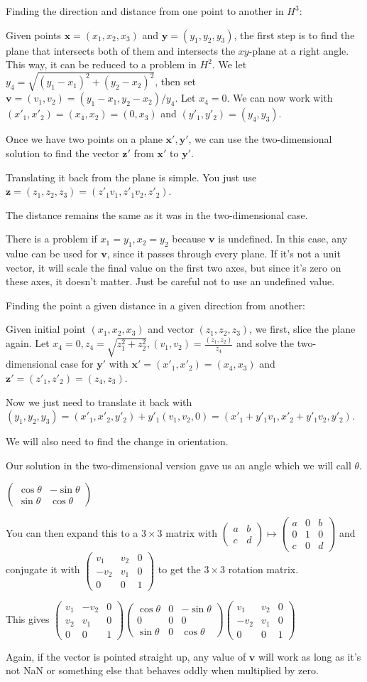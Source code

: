 \documentclass[12pt]{amsart}
\newcommand{\mat}[4]{\left(\begin{array}{ccc} #1 & #2 \\#3 & #4 \end{array} \right)}
\newcommand{\matc}[9]{\left(\begin{array}{ccc} #1 & #2 & #3 \\#4 & #5 & #6 \\#7 & #8 & #9 \end{array} \right)}
\begin{document}
Finding the direction and distance from one point to another in $H^3$:

Given points $\textbf{x} = (x_1,x_2,x_3)$ and $\textbf{y} = (y_1,y_2,y_3)$, the first step is to find the plane that intersects both of them and intersects the $xy$-plane at a right angle. This way, it can be reduced to a problem in $H^2$. We let $y_4 = \sqrt{(y_1-x_1)^2 + (y_2-x_2)^2}$, then set $\textbf{v} = (v_1,v_2) = (y_1-x_1,y_2-x_2)/y_4$. Let $x_4 = 0$. We can now work with $(x'_1,x'_2) = (x_4,x_2) = (0,x_3)$ and $(y'_1,y'_2) = (y_4,y_3)$.


Once we have two points on a plane $\textbf{x}', \textbf{y}'$, we can use the two-dimensional solution to find the vector $\textbf{z}'$ from $\textbf{x}'$ to $\textbf{y}'$.

Translating it back from the plane is simple. You just use $\textbf{z} = (z_1,z_2,z_3) = (z'_1v_1,z'_1v_2,z'_2)$.

The distance remains the same as it was in the two-dimensional case.

There is a problem if $x_1 = y_1, x_2 = y_2$ because $\textbf{v}$ is undefined. In this case, any value can be used for $\textbf{v}$, since it passes through every plane. If it's not a unit vector, it will scale the final value on the first two axes, but since it's zero on these axes, it doesn't matter. Just be careful not to use an undefined value.

\bigskip

Finding the point a given distance in a given direction from another:

\bigskip

Given initial point $(x_1,x_2,x_3)$ and vector $(z_1,z_2,z_3)$, we first, slice the plane again. Let $x_4 = 0, z_4 = \sqrt{z_1^2+z_2^2}, (v_1,v_2) = \frac{(z_1,z_2)}{z_4}$ and solve the two-dimensional case for $\textbf{y}'$ with $\textbf{x}' = (x'_1,x'_2) = (x_4,x_3)$ and $\textbf{z}' = (z'_1,z'_2) = (z_4,z_3)$.

Now we just need to translate it back with $(y_1,y_2,y_3) = (x'_1,x'_2,y'_2)+y'_1(v_1,v_2,0) = (x'_1+y'_1v_1,x'_2+y'_1v_2,y'_2)$.

We will also need to find the change in orientation.

Our solution in the two-dimensional version gave us an angle which we will call $\theta$.

$\mat{\cos\theta}{-\sin\theta}{\sin\theta}{\cos\theta}$

You can then expand this to a $3 \times 3$ matrix with $\mat{a}{b}{c}{d} \mapsto \matc{a}{0}{b}{0}{1}{0}{c}{0}{d}$ and conjugate it with $\matc{v_1}{v_2}{0}{-v_2}{v_1}{0}{0}{0}{1}$ to get the $3 \times 3$ rotation matrix.

This gives $\matc{v_1}{-v_2}{0}{v_2}{v_1}{0}{0}{0}{1} \matc{\cos\theta}{0}{-\sin\theta}{0}{0}{0}{\sin\theta}{0}{\cos\theta} \matc{v_1}{v_2}{0}{-v_2}{v_1}{0}{0}{0}{1}$

Again, if the vector is pointed straight up, any value of $\textbf{v}$ will work as long as it's not NaN or something else that behaves oddly when multiplied by zero.
\end{document}
